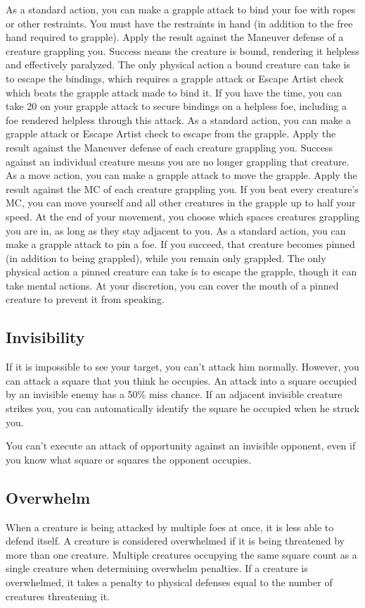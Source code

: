  As a standard action, you can make a grapple attack to bind your foe with ropes or other restraints. You must have the restraints in hand (in addition to the free hand required to grapple). Apply the result against the Maneuver defense of a creature grappling you. Success means the creature is bound, rendering it helpless and effectively paralyzed. The only physical action a bound creature can take is to escape the bindings, which requires a grapple attack or Escape Artist check which beats the grapple attack made to bind it. If you have the time, you can take 20 on your grapple attack to secure bindings on a helpless foe, including a foe rendered helpless through this attack.
 As a standard action, you can make a grapple attack or Escape Artist check to escape from the grapple. Apply the result against the Maneuver defense of each creature grappling you. Success against an individual creature means you are no longer grappling that creature.
 As a move action, you can make a grapple attack to move the grapple. Apply the result against the MC of each creature grappling you. If you beat every creature's MC, you can move yourself and all other creatures in the grapple up to half your speed. At the end of your movement, you choose which spaces creatures grappling you are in, as long as they stay adjacent to you.
 As a standard action, you can make a grapple attack to pin a foe. If you succeed, that creature becomes pinned (in addition to being grappled), while you remain only grappled. The only physical action a pinned creature can take is to escape the grapple, though it can take mental actions. At your discretion, you can cover the mouth of a pinned creature to prevent it from speaking. 

\subsection{Invisibility}
If it is impossible to see your target, you can't attack him normally. However, you can attack a square that you think he occupies. An attack into a square occupied by an invisible enemy has a 50\% miss chance. If an adjacent invisible creature strikes you, you can automatically identify the square he occupied when he struck you.

You can't execute an attack of opportunity against an invisible opponent, even if you know what square or squares the opponent occupies.

\subsection{Overwhelm}\label{Overwhelm}
When a creature is being attacked by multiple foes at once, it is less able to defend itself. A creature is considered overwhelmed if it is being threatened by more than one creature. Multiple creatures occupying the same square count as a single creature when determining overwhelm penalties. If a creature is overwhelmed, it takes a penalty to physical defenses equal to the number of creatures threatening it.

